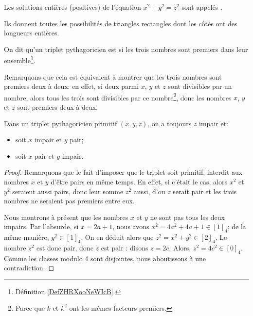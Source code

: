 \begin{definition}
    Les solutions entières (positives) de l'équation \( x^2+y^2=z^2\) sont appelés . 
\end{definition}

Ils donnent toutes les possibilités de triangles rectangles dont les côtés ont des longueurs entières.

\begin{definition}
  On dit qu'un triplet pythagoricien est  si les trois nombres sont premiers dans leur ensemble\footnote{Définition
    \ref{DefZHRXooNeWIcB}.}.
\end{definition}

Remarquons que cela est équivalent à montrer que les trois nombres sont premiers deux à deux: en effet, si deux parmi \( x\), \( y\) et \( z\) sont divisibles par un nombre, alors tous les trois sont divisibles par ce nombre\footnote{Parce que \( k\) et \( k^2\) ont les mêmes facteurs premiers.}, donc les nombres \( x\), \( y\) et \( z\) sont premiers deux à deux.

\begin{lemma}    \label{LemTripletsPythagoriciensPrimitifs}
  Dans un triplet pythagoricien primitif \( (x, y, z) \), on a toujours $z$ impair et:
  \begin{itemize}
  \item
    soit $x$ impair et $y$ pair;
  \item
    soit $x$ pair et $y$ impair.
  \end{itemize}
\end{lemma}

\begin{proof}
  Remarquons que le fait d'imposer que le triplet soit primitif, interdit aux nombres $x$ et $y$ d'être pairs en même temps. En effet, si c'était le cas, alors \( x^2 \) et \( y^2 \) seraient aussi pairs, donc leur somme \( z^2 \) aussi, d'ou $z$ serait pair et les trois nombres ne seraient pas premiers entre eux.

  Nous montrons à présent que les nombres \( x\) et \( y\) ne sont pas tous les deux impairs. Par l'absurde, si \( x=2a+1\), nous avons \( x^2=4a^2+4a+1\in [1]_4\); de la même manière,  \( y^2 \in [1]_4\). On en déduit alors que \( z^2=x^2+y^2\in [2]_4\). Le nombre \(  z^2\) est donc pair, donc \( z\) est pair : disons \( z=2c\). Alors, \( z^2=4c^2\in [0]_4\). Comme les classes modulo 4 sont disjointes, nous aboutissons à une contradiction.
\end{proof}

